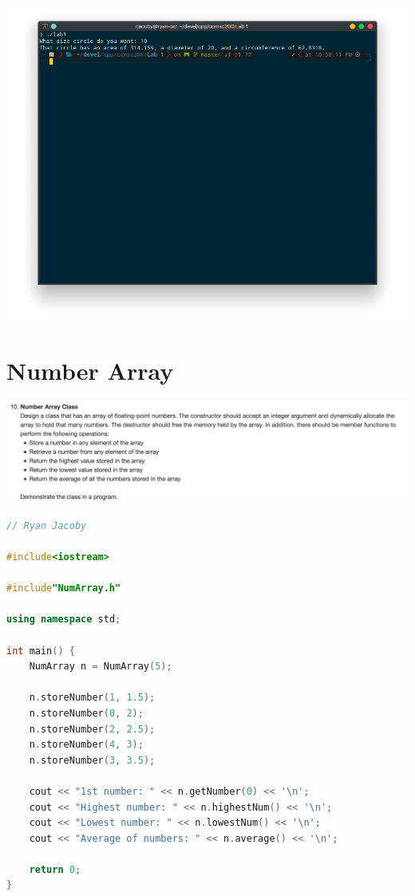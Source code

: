 \documentclass[letterpaper, 11pt]{article}
\begin{document}
\includegraphics[scale=0.5]{circle_run.png} 

\section{Number Array}

\includegraphics[scale=0.35]{numbers.png} 

\begin{lstlisting}[language=C++, caption=main.cpp]
// Ryan Jacoby

#include<iostream>

#include"NumArray.h"

using namespace std;

int main() {
    NumArray n = NumArray(5);

    n.storeNumber(1, 1.5);
    n.storeNumber(0, 2);
    n.storeNumber(2, 2.5);
    n.storeNumber(4, 3);
    n.storeNumber(3, 3.5);

    cout << "1st number: " << n.getNumber(0) << '\n';
    cout << "Highest number: " << n.highestNum() << '\n';
    cout << "Lowest number: " << n.lowestNum() << '\n';
    cout << "Average of numbers: " << n.average() << '\n';

    return 0;
}
\end{lstlisting}
\end{document}
